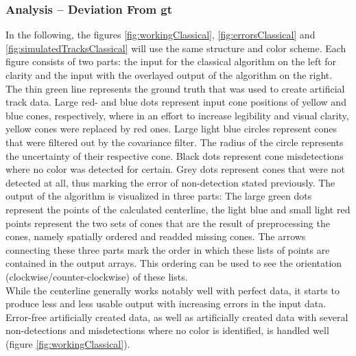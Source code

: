 \subsubsection{Analysis – Deviation From \ac{gt}}
In the following, the figures \ref{fig:workingClassical}, \ref{fig:errorsClassical} and \ref{fig:simulatedTracksClassical} will use the same structure and color scheme. Each figure consists of two parts: the input for the classical algorithm on the left for clarity and the input with the overlayed output of the algorithm on the right. The thin green line represents the ground truth that was used to create artificial track data. Large red- and blue dots represent input cone positions of yellow and blue cones, respectively, where in an effort to increase legibility and visual clarity, yellow cones were replaced by red ones. Large light blue circles represent cones that were filtered out by the covariance filter. The radius of the circle represents the uncertainty of their respective cone. Black dots represent cone misdetections where no color was detected for certain. Grey dots represent cones that were not detected at all, thus marking the error of non-detection stated previously. The output of the algorithm is visualized in three parts: The large green dots represent the points of the calculated centerline, the light blue and small light red points represent the two sets of cones that are the result of preprocessing the cones, namely spatially ordered and readded missing cones. The arrows connecting these three parts mark the order in which these lists of points are contained in the output arrays. This ordering can be used to see the orientation (clockwise/counter-clockwise) of these lists. 
\\
While the centerline generally works notably well with perfect data, it starts to produce less and less usable output with increasing errors in the input data. Error-free artificially created data, as well as artificially created data with several non-detections and misdetections where no color is identified, is handled well (figure \ref{fig:workingClassical}). 

